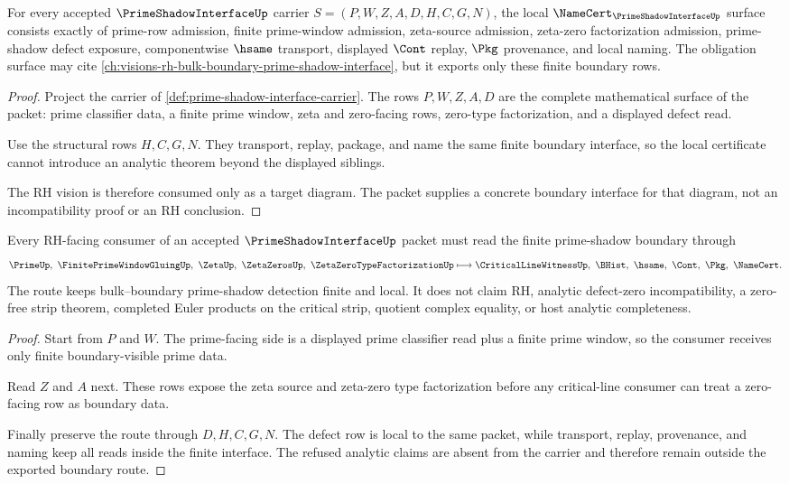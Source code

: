 \begin{theorem}
\label{thm:prime-shadow-interface-namecert-obligations}
For every accepted $\PrimeShadowInterfaceUp$ carrier $S=(P,W,Z,A,D,H,C,G,N)$, the local $\NameCert_{\PrimeShadowInterfaceUp}$ surface consists exactly of prime-row admission, finite prime-window admission, zeta-source admission, zeta-zero factorization admission, prime-shadow defect exposure, componentwise $\hsame$ transport, displayed $\Cont$ replay, $\Pkg$ provenance, and local naming. The obligation surface may cite \autoref{ch:visions-rh-bulk-boundary-prime-shadow-interface}, but it exports only these finite boundary rows.
\end{theorem}
\begin{proof}
Project the carrier of \autoref{def:prime-shadow-interface-carrier}. The rows $P,W,Z,A,D$ are the complete mathematical surface of the packet: prime classifier data, a finite prime window, zeta and zero-facing rows, zero-type factorization, and a displayed defect read.

Use the structural rows $H,C,G,N$. They transport, replay, package, and name the same finite boundary interface, so the local certificate cannot introduce an analytic theorem beyond the displayed siblings.

The RH vision is therefore consumed only as a target diagram. The packet supplies a concrete boundary interface for that diagram, not an incompatibility proof or an RH conclusion.
\end{proof}

\begin{theorem}
\label{thm:prime-shadow-interface-finite-boundary-route}
Every RH-facing consumer of an accepted $\PrimeShadowInterfaceUp$ packet must read the finite prime-shadow boundary through
$$
\PrimeUp,\ \FinitePrimeWindowGluingUp,\ \ZetaUp,\ \ZetaZerosUp,\ \ZetaZeroTypeFactorizationUp
\longmapsto
\CriticalLineWitnessUp,\ \BHist,\ \hsame,\ \Cont,\ \Pkg,\ \NameCert .
$$
The route keeps bulk--boundary prime-shadow detection finite and local. It does not claim RH, analytic defect-zero incompatibility, a zero-free strip theorem, completed Euler products on the critical strip, quotient complex equality, or host analytic completeness.
\end{theorem}
\begin{proof}
Start from $P$ and $W$. The prime-facing side is a displayed prime classifier read plus a finite prime window, so the consumer receives only finite boundary-visible prime data.

Read $Z$ and $A$ next. These rows expose the zeta source and zeta-zero type factorization before any critical-line consumer can treat a zero-facing row as boundary data.

Finally preserve the route through $D,H,C,G,N$. The defect row is local to the same packet, while transport, replay, provenance, and naming keep all reads inside the finite interface. The refused analytic claims are absent from the carrier and therefore remain outside the exported boundary route.
\end{proof}

